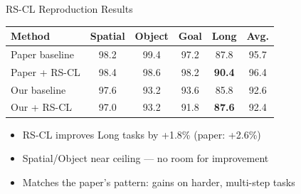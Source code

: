 \documentclass[10pt]{beamer}
\begin{document}
\begin{frame}{RS-CL Reproduction Results}

\begin{table}
  \centering
  \small
  \begin{tabular}{lccccc}
    \toprule
    \textbf{Method} & \textbf{Spatial} & \textbf{Object} & \textbf{Goal} & \textbf{Long} & \textbf{Avg.} \\
    \midrule
    Paper baseline   & 98.2 & 99.4 & 97.2 & 87.8 & 95.7 \\
    Paper + RS-CL    & 98.4 & 98.6 & 98.2 & \textbf{90.4} & 96.4 \\
    \midrule
    Our baseline     & 97.6 & 93.2 & 93.6 & 85.8 & 92.6 \\
    Our + RS-CL      & 97.0 & 93.2 & 91.8 & \textbf{87.6} & 92.4 \\
    \bottomrule
  \end{tabular}
\end{table}

\vspace{0.5em}

\begin{itemize}
  \item RS-CL improves \alert{Long tasks by +1.8\%} (paper: +2.6\%)
  \item Spatial/Object near ceiling — no room for improvement
  \item Matches the paper's pattern: gains on harder, multi-step tasks
\end{itemize}

\end{frame}
\end{document}
